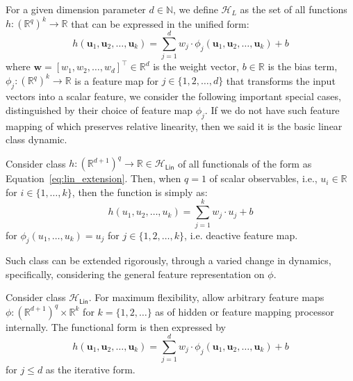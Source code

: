 \documentclass[
  journal=largetwo,
  year=2025,
  volume=37,
]{cup-journal}
\begin{document}
For a given dimension parameter $d \in \mathbb{N}$, we define $\mathcal{H}_{L}$ as the set of all functions $h: (\mathbb{R}^{q})^k \to \mathbb{R}$ that can be expressed in the unified form:
\begin{equation}\label{eq:lin_extension}
        h(\mathbf{u}_1, \mathbf{u}_2, \ldots, \mathbf{u}_k) = \sum_{j=1}^{d} w_j \cdot \phi_j(\mathbf{u}_1, \mathbf{u}_2, \ldots, \mathbf{u}_k) + b
    \end{equation}
where $\mathbf{w} = [w_1, w_2, \ldots, w_d]^{\top} \in \mathbb{R}^{d}$ is the weight vector, $b \in \mathbb{R}$ is the bias term, $\phi_j: (\mathbb{R}^{q})^k \to \mathbb{R}$ is a feature map for $j \in \{1, 2, \ldots, d\}$ that transforms the input vectors into a scalar feature, we consider the following important special cases, distinguished by their choice of feature map $\phi_j$. If we do not have such feature mapping of which preserves relative linearity, then we said it is the basic linear class dynamic. 

\begin{definition}[Linear class, $q=1$]
    Consider class $h: (\mathbb{R}^{d+1})^{q}\to \mathbb{R}\in\mathcal{H}_{\mathsf{Lin}}$ of all functionals of the form as Equation~\ref{eq:lin_extension}. Then, when $q=1$ of scalar observables, i.e., $u_i \in \mathbb{R}$ for $i \in \{1, \ldots, k\}$, then the function is simply as:
    \begin{equation}
            h(u_1, u_2, \ldots, u_k) = \sum_{j=1}^{k} w_j \cdot u_j + b
    \end{equation}
    for $\phi_j(u_1, \ldots, u_k) = u_j$ for $j \in \{1, 2, \ldots, k\}$, i.e. deactive feature map. 
\end{definition}
Such class can be extended rigorously, through a varied change in dynamics, specifically, considering the general feature representation on $\phi$. 

\begin{definition}
    Consider class $\mathcal{H}_{\mathsf{Lin}}$. For maximum flexibility, allow arbitrary feature maps $\phi: (\mathbb{R}^{d+1})^{q}\times \mathbb{R}^{k}$ for $k=\{1,2,\dots\}$ as of hidden or feature mapping processor internally. The functional form is then expressed by 
    \begin{equation}
            h(\mathbf{u}_1, \mathbf{u}_2, \ldots, \mathbf{u}_k) = \sum_{j=1}^{d} w_j \cdot \phi_j(\mathbf{u}_1, \mathbf{u}_2, \ldots, \mathbf{u}_k) + b
        \end{equation}
        for $j\leq d$ as the iterative form. 
\end{definition}
\end{document}
